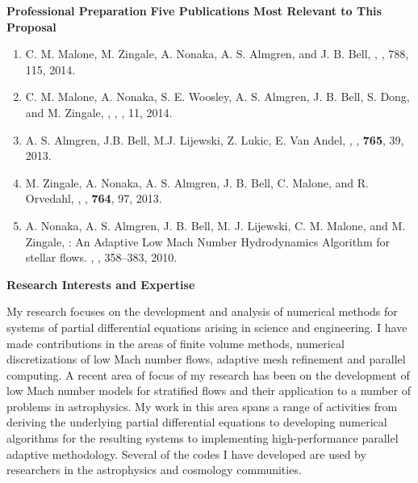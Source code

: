 \documentclass[11pt,letterpaper,english]{article}
\begin{document}
\begin{flushleft} {\bf Professional Preparation}
\vspace{.04in}
{\bf Five Publications Most Relevant to This Proposal}
\vspace{-6pt}
\begin{enumerate} \itemsep1pt \parskip0pt 
\item C. M. Malone, M. Zingale, A. Nonaka, A. S. Almgren, and J. B. Bell, ,
, 788, 115, 2014. \\ 
\item C. M. Malone, A. Nonaka, S. E. Woosley, A. S. Almgren, J. B. Bell, S. Dong, and M. Zingale, 
,
, , 11, 2014.  \\ 
\item A. S. Almgren, J.B. Bell, M.J. Lijewski, Z. Lukic, E. Van Andel,
,
, 
{\bf 765}, 39, 2013. \\ 
\item M. Zingale, A. Nonaka, A. S. Almgren, J. B. Bell, C. Malone, and R. Orvedahl, 
, 
, 
{\bf 764}, 97, 2013. \\ 
\item A. Nonaka, A. S. Almgren, J. B. Bell, M. J. Lijewski, C. M. Malone, and M. Zingale,
: An Adaptive Low Mach Number Hydrodynamics Algorithm for
  stellar flows.
, 
, 358--383, 2010. \\ 
\end{enumerate} 

\vspace{-6pt}
{\bf Research Interests and Expertise}
{\parindent 16pt

My research focuses on the development and analysis of numerical methods for systems of partial 
differential equations arising in science and engineering.  I have made contributions in the
areas of finite volume methods, numerical discretizations of low Mach number flows, adaptive
mesh refinement and parallel computing.  A recent area of focus of my research has been on the
development of low Mach number models for stratified flows and their application to a number
of problems in astrophysics.  My work in this area spans a range of activities from deriving the
underlying partial differential equations to developing numerical algorithms for the resulting
systems to implementing high-performance parallel adaptive methodology.  
Several of the codes I have developed are used by researchers in the
astrophysics and cosmology communities.
}


\end{flushleft}
\end{document}
